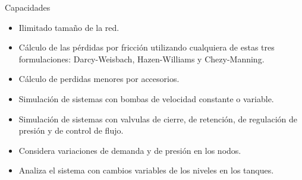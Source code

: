 \documentclass [xcolor=svgnames, t] {beamer}
\begin{document}
\begin{frame}{Capacidades}
\begin{itemize}
\item Ilimitado tama\~no de la red. 
\item C\'alculo de las p\'erdidas por fricci\'on utilizando cualquiera de estas tres formulaciones: Darcy-Weisbach, Hazen-Williams y Chezy-Manning.
\item C\'alculo de perdidas menores por accesorios.
\item Simulaci\'on de sistemas con bombas de velocidad constante o variable. 
\item Simulaci\'on de sistemas con valvulas de cierre, de retenci\'on, de regulaci\'on de presi\'on y de control de flujo.
\item Considera variaciones de demanda y de presi\'on en los nodos.
\item Analiza el sistema con cambios variables de los niveles en los tanques. 
\end{itemize}
\end{frame}
\end{document}
